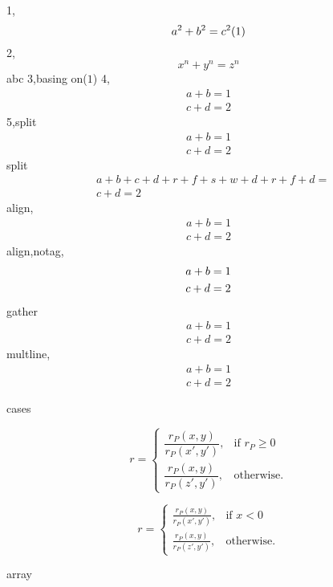 \documentclass[journal]{IEEEtran}
\begin{document}
1,$$a^2+b^2=c^2 \relax (1)$$
2,\begin{equation} x^n+y^n=z^n \end{equation}abc
3,basing on($1$)
4,
\begin{equation}
\begin{array}{l}
a+b=1 \\
c+d=2
\end{array}
\end{equation}
5,split
\begin{equation}
\begin{split}
a+b=1\\
c+d=2
\end{split}
\end{equation}
split
\begin{equation}
\begin{split}
&a+b+c+d+r+f+s+w+d+r+f+d=\\
&c+d=2
\end{split}
\end{equation}
align,
\begin{align}
a+b = 1 \\
c+d = 2
\end{align}
align,notag,
\begin{align}
a+b = 1 \notag \\
c+d = 2
\end{align}
gather
\begin{gather}
a+b=1 \\
c+d=2
\end{gather}
multline,
\begin{multline}
a+b=1 \\
c+d=2
\end{multline}

cases

\begin{equation}
r=\begin{cases}
    \dfrac{r_{P}(x,y)}{r_{P}({x}',{y}')}, & \mbox{if } r_{P}\geq 0 \\
    \dfrac{r_{P}(x,y)}{r_{P}({z}',{y}')}, & \mbox{otherwise}.
  \end{cases}
\end{equation}

\[r=\begin{cases}
      \frac{r_{P}(x,y)}{r_{P}({x}',{y}')}, & \mbox{if } x<0 \\
      \frac{r_{P}(x,y)}{r_{P}({z}',{y}')}, & \mbox{otherwise}.
    \end{cases}\]
    

array
\end{document}

